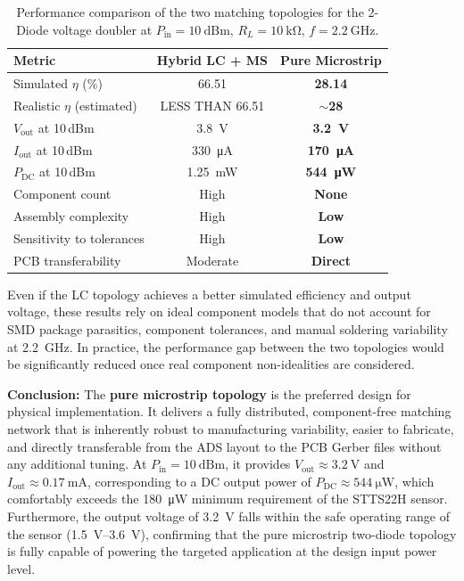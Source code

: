 \begin{table}[H]
    \centering
    \caption{Performance comparison of the two matching topologies
             for the 2-Diode voltage doubler at
             $P_\mathrm{in} = \SI{10}{\text{dBm}}$,
             $R_L = \SI{10}{\kilo\ohm}$, $f = \SI{2.2}{\giga\hertz}$.}
    \label{tab:2d_comparison}
    \begin{tabular}{lcc}
        \toprule
        \textbf{Metric} &
        \textbf{Hybrid LC + MS} &
        \textbf{Pure Microstrip} \\
        \midrule
        Simulated $\eta$ (\%)        & 66.51               & \textbf{28.14} \\
        Realistic $\eta$ (estimated) & LESS THAN 66.51         & \textbf{$\sim$28} \\
        $V_\mathrm{out}$ at 10\,dBm  & \SI{3.8}{\volt}     & \textbf{\SI{3.2}{\volt}} \\
        $I_\mathrm{out}$ at 10\,dBm  & \SI{330}{\micro\ampere} &
                                       \textbf{\SI{170}{\micro\ampere}} \\
        $P_\mathrm{DC}$ at 10\,dBm  & \SI{1.25}{\milli\watt} &
                                       \textbf{\SI{544}{\micro\watt}} \\
        Component count              & High                & \textbf{None} \\
        Assembly complexity          & High                & \textbf{Low} \\
        Sensitivity to tolerances    & High                & \textbf{Low} \\
        PCB transferability          & Moderate            & \textbf{Direct} \\
        \bottomrule
    \end{tabular}
\end{table}

Even if the LC topology achieves a better simulated
efficiency and output voltage, these results rely on ideal component
models that do not account for SMD package parasitics, component
tolerances, and manual soldering variability at \SI{2.2}{\giga\hertz}.
In practice, the performance gap between the two topologies would be
significantly reduced once real component non-idealities are considered.

\textbf{Conclusion:} The \textbf{pure microstrip topology} is the
preferred design for physical implementation. It delivers a fully
distributed, component-free matching network that is inherently robust
to manufacturing variability, easier to fabricate, and directly
transferable from the ADS layout to the PCB Gerber files without any
additional tuning. At $P_\mathrm{in} = \SI{10}{\text{dBm}}$, it
provides $V_\mathrm{out} \approx \SI{3.2}{\volt}$ and
$I_\mathrm{out} \approx \SI{0.17}{\milli\ampere}$, corresponding to
a DC output power of $P_\mathrm{DC} \approx \SI{544}{\micro\watt}$,
which comfortably exceeds the \SI{180}{\micro\watt} minimum requirement
of the STTS22H sensor. Furthermore, the output voltage of
\SI{3.2}{\volt} falls within the safe operating range of the sensor
(\SIrange{1.5}{3.6}{\volt}), confirming that the pure microstrip
two-diode topology is fully capable of powering the targeted
application at the design input power level.

